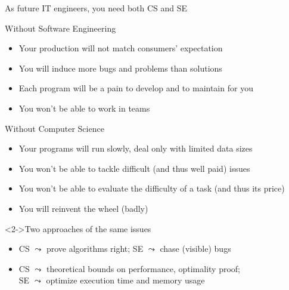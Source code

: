 \begin{frame}{As future IT engineers, you need both CS and SE}
  \begin{block}{Without Software Engineering}
    \begin{itemize}
    \item Your production will not match consumers' expectation
    \item You will induce more bugs and problems than solutions
    \item Each program will be a pain to develop and to maintain for you
    \item You won't be able to work in teams
    \end{itemize}
  \end{block}

  \begin{block}{Without Computer Science}
    \begin{itemize}
    \item Your programs will run slowly, deal only with limited data sizes
    \item You won't be able to tackle difficult (and thus well paid) issues
    \item You won't be able to evaluate the difficulty of a task (and
      thus its price)
    \item You will reinvent the wheel (badly)
    \end{itemize}
  \end{block}

  \begin{block}<2->{Two approaches of the same issues}
    \begin{itemize}
    \item {}
      CS $\leadsto$ prove algorithms right; 
      SE $\leadsto$ chase (visible) bugs
    \item {} CS $\leadsto$ theoretical bounds on
      performance, optimality proof;\\
      \hspace{16.6mm}SE $\leadsto$ optimize execution time and
      memory usage

    \end{itemize}
  \end{block}
\end{frame}
